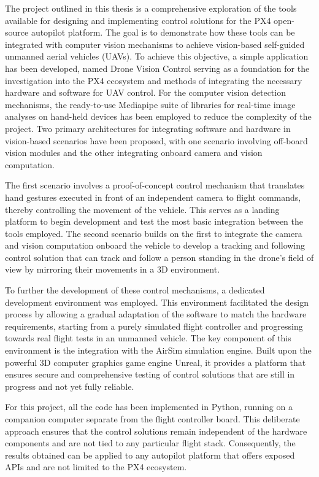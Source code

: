 The project outlined in this thesis is a comprehensive exploration of the tools available for designing and implementing control solutions for the PX4 open-source autopilot platform. The goal is to demonstrate how these tools can be integrated with computer vision mechanisms to achieve vision-based self-guided unmanned aerial vehicles (UAVs).
To achieve this objective, a simple application has been developed, named Drone Vision Control serving as a foundation for the investigation into the PX4 ecosystem and methods of integrating the necessary hardware and software for UAV control.
For the computer vision detection mechanisms, the ready-to-use Mediapipe suite of libraries for real-time image analyses on hand-held devices has been employed to reduce the complexity of the project.
Two primary architectures for integrating software and hardware in vision-based scenarios have been proposed, with one scenario involving off-board vision modules and the other integrating onboard camera and vision computation. 

The first scenario involves a proof-of-concept control mechanism that translates hand gestures executed in front of an independent camera to flight commands, thereby controlling the movement of the vehicle. This serves as a landing platform to begin development and test the most basic integration between the tools employed.
The second scenario builds on the first to integrate the camera and vision computation onboard the vehicle to develop a tracking and following control solution that can track and follow a person standing in the drone's field of view by mirroring their movements in a 3D environment.

To further the development of these control mechanisms, a dedicated development environment was employed. This environment facilitated the design process by allowing a gradual adaptation of the software to match the hardware requirements, starting from a purely simulated flight controller and progressing towards real flight tests in an unmanned vehicle.
The key component of this environment is the integration with the AirSim simulation engine. Built upon the powerful 3D computer graphics game engine Unreal, it provides a platform that ensures secure and comprehensive testing of control solutions that are still in progress and not yet fully reliable.

For this project, all the code has been implemented in Python, running on a companion computer separate from the flight controller board. This deliberate approach ensures that the control solutions remain independent of the hardware components and are not tied to any particular flight stack. Consequently, the results obtained can be applied to any autopilot platform that offers exposed APIs and are not limited to the PX4 ecosystem. 

